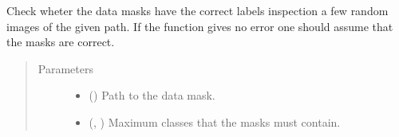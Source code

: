 \documentclass[letterpaper,10pt,english]{sphinxmanual}
\begin{document}

\begin{fulllineitems}
\label{\detokenize{utils/util:utils.util.check_masks}}
Check wheter the data masks have the correct labels inspection a few random images of the given path. If the
function gives no error one should assume that the masks are correct.
\begin{quote}\begin{description}
\item[{Parameters}] \leavevmode\begin{itemize}
\item {} 
 () \textendash{} Path to the data mask.

\item {} 
 (, ) \textendash{} Maximum classes that the masks must contain.

\end{itemize}

\end{description}\end{quote}

\end{fulllineitems}

\end{document}
